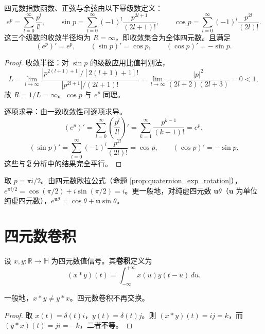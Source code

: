 \begin{theorem}\label{thm:q_exp_sin_cos}
四元数指数函数、正弦与余弦由以下幂级数定义：
\[
e^p=\sum_{l=0}^\infty\frac{p^l}{l!},\qquad
\sin p=\sum_{l=0}^\infty(-1)^l\frac{p^{2l+1}}{(2l+1)!},\qquad
\cos p=\sum_{l=0}^\infty(-1)^l\frac{p^{2l}}{(2l)!}.
\]
这三个级数的收敛半径均为 $R=\infty$，即收敛集合为全体四元数。且满足
\[
(e^p)'=e^p,\qquad (\sin p)'=\cos p,\qquad (\cos p)'=-\sin p.
\]
\end{theorem}

\begin{proof}
收敛半径：对 $\sin p$ 的级数应用比值判别法，
\[
L=\lim_{l\to\infty}\frac{|p^{2(l+1)+1}|/[2(l+1)+1]!}{|p^{2l+1}|/(2l+1)!}
=\lim_{l\to\infty}\frac{|p|^2}{(2l+2)(2l+3)}=0<1,
\]
故 $R=1/L=\infty$。$\cos p$ 与 $e^p$ 同理。

逐项求导：由一致收敛性可逐项求导。
\[
(e^p)'=\sum_{l=0}^\infty\left(\frac{p^l}{l!}\right)'=\sum_{k=1}^\infty\frac{p^{k-1}}{(k-1)!}=e^p,
\]
\[
(\sin p)'=\sum_{l=0}^\infty(-1)^l\frac{p^{2l}}{(2l)!}=\cos p,\qquad
(\cos p)'=-\sin p.
\]
这些与复分析中的结果完全平行。
\end{proof}

\begin{example}[四元数指数函数的计算]\label{ex:q_exp_calc}
取 $p=\pi i/2$。由四元数欧拉公式（命题 \ref{prop:quaternion_exp_rotation}），$e^{\pi i/2}=\cos(\pi/2)+i\sin(\pi/2)=i$。更一般地，对纯虚四元数 $\mathbf{u}\theta$（$\mathbf{u}$ 为单位纯虚四元数），$e^{\mathbf{u}\theta}=\cos\theta+\mathbf{u}\sin\theta$。
\end{example}

\section{四元数卷积}

\begin{definition}[四元数卷积]\label{def:q_convolution}
设 $x,y:\mathbb{R}\to\mathbb{H}$ 为四元数值信号。其\textbf{卷积}定义为
\[
(x*y)(t)=\int_{-\infty}^{+\infty}x(u)y(t-u)\,du.
\]
\end{definition}

\begin{theorem}[四元数卷积的非交换性]\label{thm:q_convolution_noncommutative}
一般地，$x*y\neq y*x$。四元数卷积不再交换。
\end{theorem}

\begin{proof}
取 $x(t)=\delta(t)i$，$y(t)=\delta(t)j$。则 $(x*y)(t)=ij=k$，而 $(y*x)(t)=ji=-k$，二者不等。
\end{proof}

